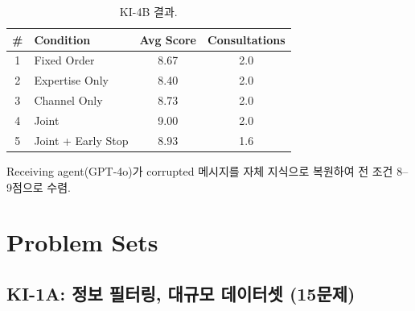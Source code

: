 \documentclass[11pt]{article}
\begin{document}
\begin{table}[h]
\centering
\caption{KI-4B 결과.}
\begin{tabular}{clcc}
\toprule
\# & Condition & Avg Score & Consultations \\
\midrule
1 & Fixed Order       & 8.67 & 2.0 \\
2 & Expertise Only    & 8.40 & 2.0 \\
3 & Channel Only      & 8.73 & 2.0 \\
4 & Joint             & 9.00 & 2.0 \\
5 & Joint + Early Stop & 8.93 & 1.6 \\
\bottomrule
\end{tabular}
\end{table}

Receiving agent(GPT-4o)가 corrupted 메시지를 자체 지식으로 복원하여 전 조건 8--9점으로 수렴.

\appendix
\section{Problem Sets}

\subsection{KI-1A: 정보 필터링, 대규모 데이터셋 (15문제)}
\end{document}
